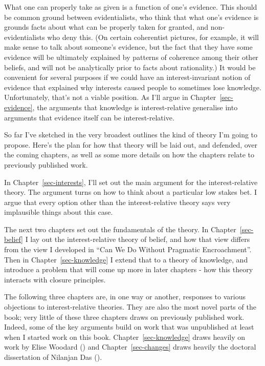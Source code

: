 \documentclass[
  10pt,
  letterpaper,
  twoside]{scrbook}
\begin{document}
What one can properly take as given is a function of one's evidence.
This should be common ground between evidentialists, who think that what
one's evidence is grounds facts about what can be properly taken for
granted, and non-evidentialists who deny this. (On certain coherentist
pictures, for example, it will make sense to talk about someone's
evidence, but the fact that they have some evidence will be ultimately
explained by patterns of coherence among their other beliefs, and will
not be analytically prior to facts about rationality.) It would be
convenient for several purposes if we could have an interest-invariant
notion of evidence that explained why interests caused people to
sometimes lose knowledge. Unfortunately, that's not a viable position.
As I'll argue in Chapter~\ref{sec-evidence}, the arguments that
knowledge is interest-relative generalise into arguments that evidence
itself can be interest-relative.

So far I've sketched in the very broadest outlines the kind of theory
I'm going to propose. Here's the plan for how that theory will be laid
out, and defended, over the coming chapters, as well as some more
details on how the chapters relate to previously published work.

In Chapter~\ref{sec-interests}, I'll set out the main argument for the
interest-relative theory. The argument turns on how to think about a
particular low stakes bet. I argue that every option other than the
interest-relative theory says very implausible things about this case.

The next two chapters set out the fundamentals of the theory. In
Chapter~\ref{sec-belief} I lay out the interest-relative theory of
belief, and how that view differs from the view I developed in ``Can We
Do Without Pragmatic Encroachment''. Then in Chapter~\ref{sec-knowledge}
I extend that to a theory of knowledge, and introduce a problem that
will come up more in later chapters - how this theory interacts with
closure principles.

The following three chapters are, in one way or another, responses to
various objections to interest-relative theories. They are also the most
novel parts of the book; very little of these three chapters draws on
previously published work. Indeed, some of the key arguments build on
work that was unpublished at least when I started work on this book.
Chapter~\ref{sec-knowledge} draws heavily on work by Elise Woodard
() and Chapter~\ref{sec-changes}
draws heavily the doctoral dissertation of Nilanjan Das
().
\end{document}
